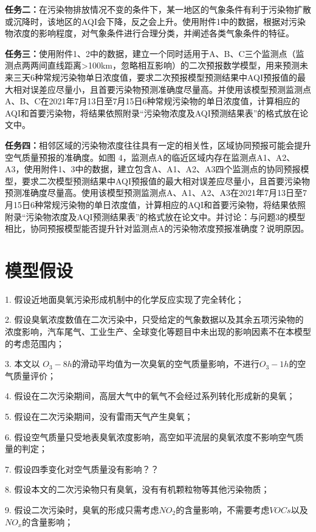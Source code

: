 \documentclass[a4paper,10pt]{my_paper}
\numberwithin{equation}{section}
\begin{document}
\textbf{任务二：}在污染物排放情况不变的条件下，某一地区的气象条件有利于污染物扩散或沉降时，该地区的AQI会下降，反之会上升。使用附件1中的数据，根据对污染物浓度的影响程度，对气象条件进行合理分类，并阐述各类气象条件的特征。

\textbf{任务三：}使用附件1、2中的数据，建立一个同时适用于A、B、C三个监测点（监测点两两间直线距离>100km，忽略相互影响）的二次预报数学模型，用来预测未来三天6种常规污染物单日浓度值，要求二次预报模型预测结果中AQI预报值的最大相对误差应尽量小，且首要污染物预测准确度尽量高。并使用该模型预测监测点A、B、C在2021年7月13日至7月15日6种常规污染物的单日浓度值，计算相应的AQI和首要污染物，将结果依照附录“污染物浓度及AQI预测结果表”的格式放在论文中。

\textbf{任务四：}相邻区域的污染物浓度往往具有一定的相关性，区域协同预报可能会提升空气质量预报的准确度。如图 4，监测点A的临近区域内存在监测点A1、A2、A3，使用附件1、3中的数据，建立包含A、A1、A2、A3四个监测点的协同预报模型，要求二次模型预测结果中AQI预报值的最大相对误差应尽量小，且首要污染物预测准确度尽量高。使用该模型预测监测点A、A1、A2、A3在2021年7月13日至7月15日6种常规污染物的单日浓度值，计算相应的AQI和首要污染物，将结果依照附录“污染物浓度及AQI预测结果表”的格式放在论文中。并讨论：与问题3的模型相比，协同预报模型能否提升针对监测点A的污染物浓度预报准确度？说明原因。
\section{模型假设}
1. 假设近地面臭氧污染形成机制中的化学反应实现了完全转化；

2. 假设臭氧浓度数值在二次污染中，只受给定的气象数据以及其余五项污染物的浓度影响，汽车尾气、工业生产、全球变化等题目中未出现的影响因素不在本模型的考虑范围内；

3. 本文以 ${O_3-8h}$的滑动平均值为一次臭氧的空气质量影响，不进行${O_3-1h}$的空气质量评价；

4. 假设在二次污染期间，高层大气中的氧气不会经过系列转化形成新的臭氧；

5. 假设在二次污染期间，没有雷雨天气产生臭氧；

6. 假设空气质量只受地表臭氧浓度影响，高空如平流层的臭氧浓度不影响空气质量的判定；

7. {\color{red}假设四季变化对空气质量没有影响？？}

8. 假设本文的二次污染物只有臭氧，没有有机颗粒物等其他污染物质；

9. 假设二次污染时，臭氧的形成只需考虑${NO_2}$的含量影响，不需要考虑${VOCs}$以及${NO_x}$的含量影响；
\end{document}
